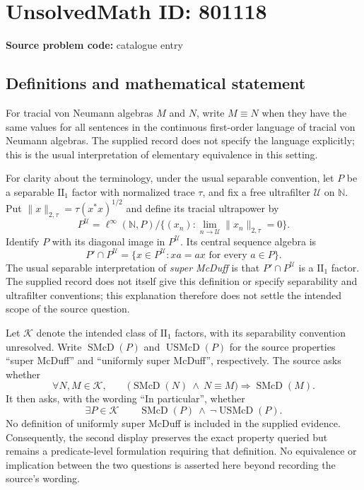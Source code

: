 \documentclass[11pt]{article}
\begin{document}
\section*{UnsolvedMath ID: 801118}
\textbf{Source problem code:} catalogue entry
\subsection{Definitions and mathematical statement}
For tracial von Neumann algebras \(M\) and \(N\), write \(M\equiv N\) when they have the same values for all sentences in the continuous first-order language of tracial von Neumann algebras. The supplied record does not specify the language explicitly; this is the usual interpretation of elementary equivalence in this setting.

For clarity about the terminology, under the usual separable convention, let \(P\) be a separable \(\mathrm{II}_1\) factor with normalized trace \(\tau\), and fix a free ultrafilter \(\mathcal U\) on \(\mathbb N\). Put \(\|x\|_{2,\tau}=\tau(x^*x)^{1/2}\) and define its tracial ultrapower by
\[
P^{\mathcal U}=\ell^\infty(\mathbb N,P)\big/\bigl\{(x_n):\lim_{n\to\mathcal U}\|x_n\|_{2,\tau}=0\bigr\}.
\]
Identify \(P\) with its diagonal image in \(P^{\mathcal U}\). Its central sequence algebra is
\[
P'\cap P^{\mathcal U}=\{x\in P^{\mathcal U}:xa=ax\text{ for every }a\in P\}.
\]
The usual separable interpretation of \emph{super McDuff} is that \(P'\cap P^{\mathcal U}\) is a \(\mathrm{II}_1\) factor. The supplied record does not itself give this definition or specify separability and ultrafilter conventions; this explanation therefore does not settle the intended scope of the source question.

Let \(\mathcal K\) denote the intended class of \(\mathrm{II}_1\) factors, with its separability convention unresolved. Write \(\operatorname{SMcD}(P)\) and \(\operatorname{USMcD}(P)\) for the source properties ``super McDuff'' and ``uniformly super McDuff'', respectively. The source asks whether
\[
\forall N,M\in\mathcal K,\qquad
\bigl(\operatorname{SMcD}(N)\ \land\ N\equiv M\bigr)
\Longrightarrow \operatorname{SMcD}(M).
\]
It then asks, with the wording ``In particular'', whether
\[
\exists P\in\mathcal K\qquad
\operatorname{SMcD}(P)\ \land\ \neg\operatorname{USMcD}(P).
\]
No definition of uniformly super McDuff is included in the supplied evidence. Consequently, the second display preserves the exact property queried but remains a predicate-level formulation requiring that definition. No equivalence or implication between the two questions is asserted here beyond recording the source's wording.
\end{document}
